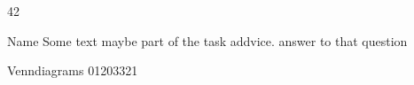 \documentclass{scrartcl}
\begin{document}
    \begin{ukon-infie}[1/April/1960]{42}
		\begin{exercise}[p=1,z=1]{Name}
			Some text maybe part of the task addvice.
		    {
		    	answer to that question
		    }
		\end{exercise}
        
        \begin{exercise}[p=10,bubble]{Venndiagrams}
        	{
        	}
	       	{
	       	{01203321}
	       	}
        \end{exercise}

    \end{ukon-infie}
\end{document}
